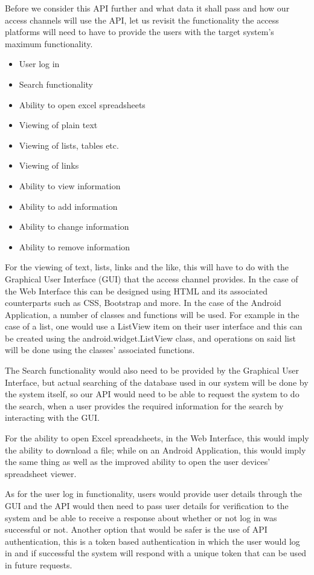 \documentclass[a4paper,12pt]{article}
\begin{document}
Before we consider this API further and what data it shall pass and how our access channels will use the API, let us revisit the functionality the access platforms will need to have to provide the users with the target system's maximum functionality.
\begin{itemize}
	\item User log in
	\item Search functionality
	\item Ability to open excel spreadsheets
	\item Viewing of plain text
	\item Viewing of lists, tables etc.
	\item Viewing of links
	\item Ability to view information
	\item Ability to add information
	\item Ability to change information
	\item Ability to remove information
\end{itemize}

For the viewing of text, lists, links and the like, this will have to do with the Graphical User Interface (GUI) that the access channel provides. In the case of the Web Interface this can be designed using HTML and its associated counterparts such as CSS, Bootstrap and more. In the case of the Android Application, a number of classes and functions will be used. For example in the case of a list, one would use a ListView item on their user interface and this can be created using the android.widget.ListView class, and operations on said list will be done using the classes' associated functions.

The Search functionality would also need to be provided by the Graphical User Interface, but actual searching of the database used in our system will be done by the system itself, so our API would need to be able to request the system to do the search, when a user provides the required information for the search by interacting with the GUI.

For the ability to open Excel spreadsheets, in the Web Interface, this would imply the ability to download a file; while on an Android Application, this would imply the same thing as well as the improved ability to open the user devices' spreadsheet viewer.

As for the user log in functionality, users would provide user details through the GUI and the API would then need to pass user details for verification to the system and be able to receive a response about whether or not log in was successful or not. Another option that would be safer is the use of API authentication, this is a token based authentication in which the user would log in and if successful the system will respond with a unique token that can be used in future requests.
\end{document}
